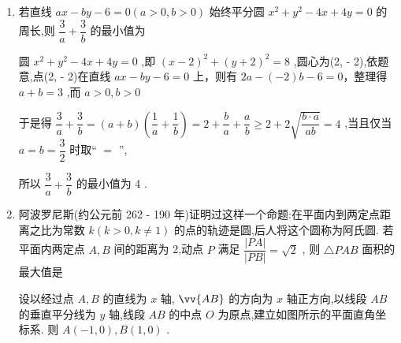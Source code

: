 \begin{enumerate}
\begin{enumerate}
\begin{jieda}
\begin{enumerate}
                由圆的方程 ${\left( x - 3\right) }^{2} + {y}^{2} = 4$ ,易知 $1 \leq  x \leq  5$ ,
                
                所以当 $x = 5$ 时, $\left| {\vv{PA} + \vv{PB}}\right|$ 的值最大,最大值为 $2 \times  \sqrt{6 \times  5 - 5} = {10}$ .
                \item 由题意,知 $\vv{PA} = \left( {-x,2 - y}\right)$，$\vv{PB} = \left( {-x, - 2 - y}\right)$所以 $\vv{PA} \cdot \vv{PB} = x^2+y^2-4$

                由于点 $P\left( {x,y}\right)$ 是圆上的点,故其坐标满足方程${\left( x - 3\right) }^{2} + {y}^{2} = 4$，所以 $\vv{PA} \cdot  \vv{PB} =  x^2+4-(x-3)^2-4 = x^2-(x-3)^2 = 6x-9 (x \in [1, 5])$，故$\vv{PA} \cdot  \vv{PB} \leq 21$，$x = 5$时取得最值.
            \end{enumerate}
        \end{jieda}
        \item 若直线 ${ax} - {by} - 6 = 0\left( {a > 0,b > 0}\right)$ 始终平分圆 ${x}^{2} + {y}^{2} - {4x} + {4y} = 0$ 的周长,则 $\dfrac{3}{a} + \dfrac{3}{b}$ 的最小值为
        \begin{jieda}
            圆 ${x}^{2} + {y}^{2} - {4x} + {4y} = 0$ ,即 ${\left( x - 2\right) }^{2} + {\left( y + 2\right) }^{2} = 8$ ,圆心为(2, - 2),依题意,点(2, - 2)在直线 ${ax} - {by} - 6 = 0$ 上，则有 ${2a} - \left( {-2}\right) b - 6 = 0$，整理得 $a + b = 3$ ,而 $a > 0,b > 0$
            
            于是得 $\dfrac{3}{a} + \dfrac{3}{b} = \left( {a + b}\right) \left( {\dfrac{1}{a} + \dfrac{1}{b}}\right)  = 2 + \dfrac{b}{a} + \dfrac{a}{b} \geq  2 + 2\sqrt{\dfrac{b \cdot  a}{ab}} = 4$ ,当且仅当 $a = b = \dfrac{3}{2}$ 时取“ $=$ ”,
            
            所以 $\dfrac{3}{a} + \dfrac{3}{b}$ 的最小值为 4 .
        \end{jieda}
        \item 阿波罗尼斯(约公元前 262 - 190 年)证明过这样一个命题:在平面内到两定点距离之比为常数 $k\left( {k > 0,k \neq  1}\right)$ 的点的轨迹是圆,后人将这个圆称为阿氏圆. 若平面内两定点 $A,B$ 间的距离为 2,动点 $P$ 满足 $\dfrac{\left| PA\right| }{\left| PB\right| } = \sqrt{2}$ , 则 $\bigtriangleup {PAB}$ 面积的最大值是 
        \begin{jieda}
            设以经过点 $A,B$ 的直线为 $x$ 轴, $\vv{AB}$ 的方向为 $x$ 轴正方向,以线段 ${AB}$ 的垂直平分线为 $y$ 轴,线段 ${AB}$ 的中点 $O$ 为原点,建立如图所示的平面直角坐标系. 则 $A\left( {-1,0}\right) ,B\left( {1,0}\right)$ .
            

\end{jieda}
\end{enumerate}
\end{enumerate}
